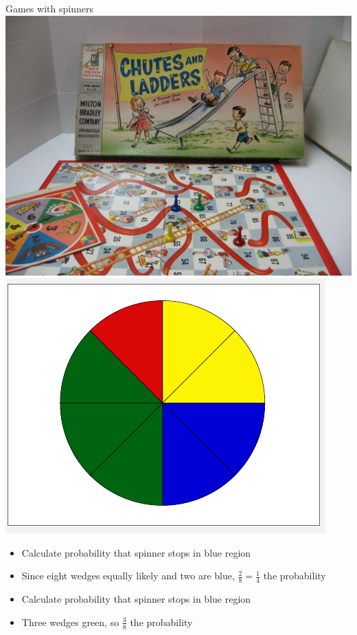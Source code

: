 \documentclass[handout]{beamer}
\theoremstyle{definition}
\begin{document}
\begin{frame}{Games with spinners}
\includegraphics[scale=.22]{ChutesAndLadders}
\includegraphics[scale=.30]{Spinner}
\begin{itemize}
\item Calculate probability that spinner stops in blue region
\item Since eight wedges equally likely and two are blue,
$\frac{2}{8}=\frac{1}{4}$ the probability 
\item Calculate probability that spinner stops in blue region
\item Three wedges green, so $\frac{3}{8}$ the probability
\end{itemize}
\end{frame}
\end{document}
